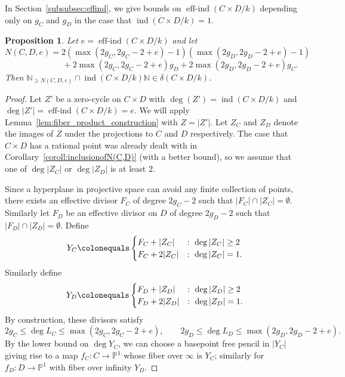 \documentclass[a4paper,11pt]{amsart}
\theoremstyle{plain}
\newtheorem{prop}[thm]{Proposition}
\theoremstyle{remark}
\newcommand{\nn}{\mathbb{N}}
\renewcommand{\P}{\mathbb{P}}
\newcommand{\dendegs}{\delta}
\newcommand{\ind}{\operatorname{ind}}
\newcommand{\effind}{\operatorname{eff-ind}}
\begin{document}
In Section~\ref{subsubsec:effind}, we give bounds on \(\effind(C \times D/k)\) depending only on \(g_C\) and \(g_D\) in the case that \(\ind(C \times D/k) = 1\). 

\begin{prop}\label{thm:generalN}
    Let \(e = \effind(C \times D/k)\) and let
    \[N(C, D, e) = 2(\max(2g_C, 2g_C-2+e) - 1)( \max(2g_D, 2g_D-2+e) -1) \] 
    \[\qquad \qquad \qquad + 2\max(2g_C, 2g_C-2+e)g_D + 2\max(2g_D, 2g_D-2+e)g_C.\]
    Then \(\nn_{\geq N(C,D, e)} \cap \ind(C \times D/k) \nn \in \dendegs(C \times D/k)\).
\end{prop}
\begin{proof}
    Let \(Z'\) be a zero-cycle on \(C \times D\) with \(\deg(Z') = \ind(C \times D/k)\) and \(\deg |Z'| = \effind(C \times D/k) = e\).  
    We will apply Lemma~\ref{lem:fiber_product_construction} with \(Z = |Z'|\).  Let \(Z_C\) and \(Z_D\) denote the images of \(Z\) under the projections to \(C\) and \(D\) respectively.
    The case that \(C \times D\) has a rational point was already dealt with in Corollary~\ref{coroll:inclusionofN(C,D)} (with a better bound), so we assume that one of \(\deg |Z_C|\) or \(\deg |Z_D|\) is at least \(2\).
    
    Since a hyperplane in projective space can avoid any finite collection of points, there exists an effective divisor \(F_C\) of degree \(2g_C - 2\) such that \(|F_C| \cap |Z_C| = \emptyset\).  Similarly let \(F_D\) be an effective divisor on \(D\) of degree \(2g_D - 2\) such that \(|F_D|\cap |Z_D| = \emptyset\).  Define
    \[Y_C \colonequals \begin{cases} F_C + |Z_C| &: \ \deg|Z_C| \geq 2 \\ F_C + 2|Z_C| & : \ \deg |Z_C| = 1.\end{cases}\]
    Similarly define
        \[Y_D \colonequals \begin{cases} F_D + |Z_D| &: \ \deg|Z_D| \geq 2 \\ F_D + 2|Z_D| & : \ \deg |Z_D| = 1.\end{cases}\]
    By construction, these divisors satisfy 
    \[2g_C \leq \deg L_C \leq \max(2g_C, 2g_C -2 + e), \qquad 2g_D \leq \deg L_D \leq \max(2g_D, 2g_D -2 + e).\]
    By the lower bound on \(\deg Y_C\), we can choose a basepoint free pencil in \(|Y_C|\) giving rise to a map \(f_C \colon C \to \P^1\) whose fiber over \(\infty\) is \(Y_C\); similarly for \(f_D \colon D \to \P^1\) with fiber over infinity \(Y_D\).


\end{proof}
\end{document}
